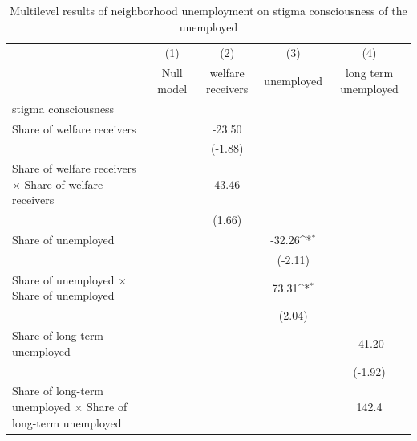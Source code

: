 \begin{table}[htbp]\centering
\def\sym#1{\ifmmode^{#1}\else\(^{#1}\)\fi}
\caption{Multilevel results of neighborhood unemployment on stigma consciousness of the unemployed \label{tab-nh}}
\begin{tabular}{l*{4}{c}}
\toprule
                    &\multicolumn{1}{c}{(1)}&\multicolumn{1}{c}{(2)}&\multicolumn{1}{c}{(3)}&\multicolumn{1}{c}{(4)}\\
                    &\multicolumn{1}{c}{Null model}&\multicolumn{1}{c}{welfare receivers}&\multicolumn{1}{c}{unemployed}&\multicolumn{1}{c}{long term unemployed}\\
\midrule
stigma consciousness&                     &                     &                     &                     \\
Share of welfare receivers&                     &      -23.50         &                     &                     \\
                    &                     &     (-1.88)         &                     &                     \\
\addlinespace
Share of welfare receivers $\times$ Share of welfare receivers&                     &       43.46         &                     &                     \\
                    &                     &      (1.66)         &                     &                     \\
\addlinespace
Share of unemployed &                     &                     &      -32.26\sym{*}  &                     \\
                    &                     &                     &     (-2.11)         &                     \\
\addlinespace
Share of unemployed $\times$ Share of unemployed&                     &                     &       73.31\sym{*}  &                     \\
                    &                     &                     &      (2.04)         &                     \\
\addlinespace
Share of long-term unemployed&                     &                     &                     &      -41.20         \\
                    &                     &                     &                     &     (-1.92)         \\
\addlinespace
Share of long-term unemployed $\times$ Share of long-term unemployed&                     &                     &                     &       142.4         \\

\end{tabular}
\end{table}
